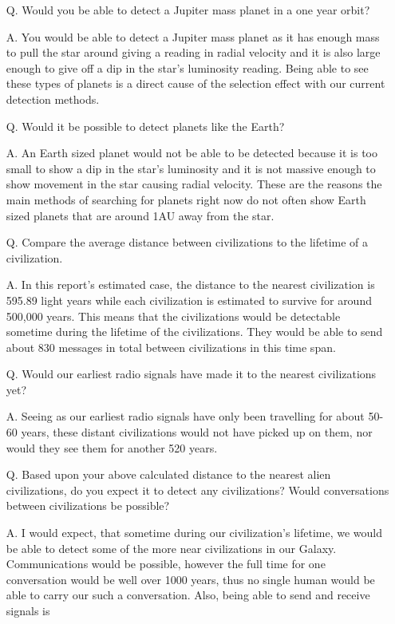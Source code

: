 \documentclass{article}
\begin{document}
\begin{enumerate}
\item[Q.] Would you be able to detect a Jupiter mass planet in a one year orbit?
\item[A.] You would be able to detect a Jupiter mass planet as it has enough mass to pull the star around giving a reading in 
radial velocity and it is also large enough to give off a dip in the star's luminosity reading. Being able to see these types of
planets is a direct cause of the selection effect with our current detection methods.
\item[Q.] Would it be possible to detect planets like the Earth?
\item[A.] An Earth sized planet would not be able to be detected because it is too small to show a dip in the star's luminosity
and it is not massive enough to show movement in the star causing radial velocity. These are the reasons the main methods
of searching for planets right now do not often show Earth sized planets that are around 1AU away from the star.
\item[Q.] Compare the average distance between civilizations to the lifetime of a civilization.
\item[A.] In this report's estimated case, the distance to the nearest civilization is 595.89 light years while each civilization is
estimated to survive for around 500,000 years. This means that the civilizations would be detectable sometime during
the lifetime of the civilizations. They would be able to send about 830 messages in total between civilizations in this
time span.
\item[Q.] Would our earliest radio signals have made it to the nearest civilizations yet?
\item[A.] Seeing as our earliest radio signals have only been travelling for about 50-60 years, these distant civilizations would
not have picked up on them, nor would they see them for another 520 years.
\item[Q.] Based upon your above calculated distance to the nearest alien civilizations, do you expect it to detect any civilizations?
Would conversations between civilizations be possible?
\item[A.] I would expect, that sometime during our civilization's lifetime, we would be able to detect some of the more near
civilizations in our Galaxy. Communications would be possible, however the full time for one conversation would be well over 
1000 years, thus no single human would be able to carry our such a conversation. Also, being able to send and receive signals is

\end{enumerate}
\end{document}
